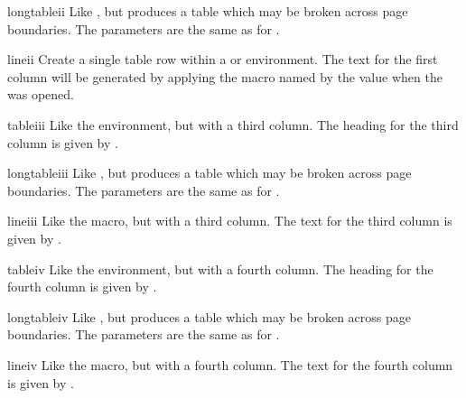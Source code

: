 \documentclass{howto}
\begin{document}
    \begin{envdesc}{longtableii}{\unspecified}
      Like , but produces a table which may be broken
      across page boundaries.  The parameters are the same as for
      .
    \end{envdesc}

    \begin{macrodesc}{lineii}{}
      Create a single table row within a  or
       environment.
      The text for the first column will be generated by applying the
      macro named by the  value when the 
      was opened.
    \end{macrodesc}

    \begin{envdesc}{tableiii}{}
      Like the  environment, but with a third column.
      The heading for the third column is given by .
    \end{envdesc}

    \begin{envdesc}{longtableiii}{\unspecified}
      Like , but produces a table which may be broken
      across page boundaries.  The parameters are the same as for
      .
    \end{envdesc}

    \begin{macrodesc}{lineiii}{}
      Like the  macro, but with a third column.  The
      text for the third column is given by .
    \end{macrodesc}

    \begin{envdesc}{tableiv}{}
      Like the  environment, but with a fourth column.
      The heading for the fourth column is given by .
    \end{envdesc}

    \begin{envdesc}{longtableiv}{\unspecified}
      Like , but produces a table which may be broken
      across page boundaries.  The parameters are the same as for
      .
    \end{envdesc}

    \begin{macrodesc}{lineiv}{}
      Like the  macro, but with a fourth column.  The
      text for the fourth column is given by .
    \end{macrodesc}
\end{document}

